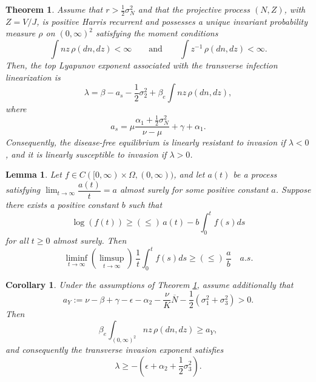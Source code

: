 \documentclass[10pt,a4paper]{amsart}
\newtheorem{theorem}{Theorem}
\newtheorem{corollary}{Corollary}
\newtheorem{lemma}{Lemma}
\begin{document}
\begin{theorem}\label{thm:main}
Assume that $r>\frac12\sigma_N^2$ and that the projective process $(N,Z)$, with $Z=V/J$, is positive Harris recurrent and possesses a unique invariant probability measure $\rho$ on $(0,\infty)^2$ satisfying the moment conditions
\begin{equation}\label{eq:rho-moments}
\int nz\,\rho(dn,dz)<\infty
\qquad\text{and}\qquad
\int z^{-1}\,\rho(dn,dz)<\infty.
\end{equation}
Then, the top Lyapunov exponent associated with the transverse infection linearization is
$$
\lambda
=
\beta-a_s-\frac12\sigma_2^2
+\beta_e\int nz\,\rho(dn,dz),
$$
where
$$a_s = \mu\frac{\alpha_1+\frac12\sigma_N^2}{\nu-\mu}+\gamma+\alpha_1.
$$
Consequently, the disease-free equilibrium is linearly resistant to invasion if $\lambda<0$, and it is linearly susceptible to invasion if $\lambda>0$.
\end{theorem}

\begin{lemma}\label{Ap1}
Let $f\in C([0,\infty)\times \Omega,(0,\infty))$, and let $a(t)$ be a process satisfying $\lim_{t \to \infty} \dfrac{a(t)}{t}=a$ almost surely for some positive constant $a$.  Suppose there exists a positive constant $b$ such that
$$\log(f(t))\geq (\leq) \, a(t)-b\int_0^t f(s)ds $$
for all $t\geq 0$ almost surely. Then
$$\liminf_{t\to \infty} (\limsup_{t\to \infty})\, \frac{1}{t} \int_0^t f(s)ds\geq (\leq) \, \dfrac{a}{b} \quad a.s.$$
\end{lemma}

\begin{corollary}
\label{cor:lambda-lower-bound}
Under the assumptions of Theorem \ref{thm:main}, assume additionally that
\begin{equation}\label{eq:aY-positive}
a_Y
:=
\nu-\beta+\gamma-\epsilon-\alpha_2
-\frac{\nu}{K}\overline N
-\frac12(\sigma_1^2+\sigma_3^2)
>0.
\end{equation}
Then
\begin{equation}\label{eq:nz-lower-bound}
\beta_e\int_{(0,\infty)^2} nz\,\rho(dn,dz)
\geq a_Y,
\end{equation}
and consequently the transverse invasion exponent satisfies
\begin{equation}\label{eq:lambda-lower-bound}
\lambda
\geq
-\left(
\epsilon+\alpha_2+\frac12\sigma_3^2
\right).
\end{equation}
\end{corollary}
\end{document}
